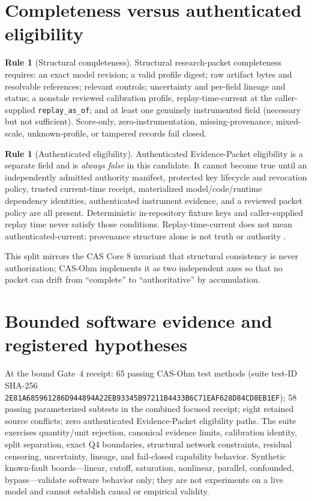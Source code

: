 \documentclass[11pt]{amsart}
\theoremstyle{definition}
\newtheorem{ruleenv}[theorem]{Rule}
\theoremstyle{remark}
\begin{document}
\section{Completeness versus authenticated eligibility}\label{sec:eligibility}

\begin{ruleenv}[Structural completeness]\label{rule:completeness}
Structural research-packet completeness requires: an exact model revision; a valid profile digest; raw artifact bytes and resolvable references; relevant controls; uncertainty and per-field lineage and status; a nonstale reviewed calibration profile, replay-time-current at the caller-supplied \texttt{replay\_as\_of}; and at least one genuinely instrumented field (necessary but not sufficient). Score-only, zero-instrumentation, missing-provenance, mixed-scale, unknown-profile, or tampered records fail closed.
\end{ruleenv}

\begin{ruleenv}[Authenticated eligibility]\label{rule:eligibility}
Authenticated Evidence-Packet eligibility is a separate field and is \emph{always false} in this candidate. It cannot become true until an independently admitted authority manifest, protected key lifecycle and revocation policy, trusted current-time receipt, materialized model/code/runtime dependency identities, authenticated instrument evidence, and a reviewed packet policy are all present. Deterministic in-repository fixture keys and caller-supplied replay time never satisfy those conditions. Replay-time-current does not mean authenticated-current; provenance structure alone is not truth or authority \cite{prov}.
\end{ruleenv}

This split mirrors the CAS Core 8 invariant that structural consistency is never authorization; CAS-Ohm implements it as two independent axes so that no packet can drift from ``complete'' to ``authoritative'' by accumulation.

\section{Bounded software evidence and registered hypotheses}\label{sec:evidence}

At the bound Gate~4 receipt: 65 passing CAS-Ohm test methods (suite test-ID SHA-256 \texttt{2E81A685961286D944894A22EB93345B97211B4433B6C71EAF628D84CD8EB1EF}); 58 passing parameterized subtests in the combined focused receipt; eight retained source conflicts; zero authenticated Evidence-Packet eligibility paths. The suite exercises quantity/unit rejection, canonical evidence limits, calibration identity, split separation, exact Q4 boundaries, structural network constraints, residual censoring, uncertainty, lineage, and fail-closed capability behavior. Synthetic known-fault boards---linear, cutoff, saturation, nonlinear, parallel, confounded, bypass---validate software behavior only; they are not experiments on a live model and cannot establish causal or empirical validity.
\end{document}
